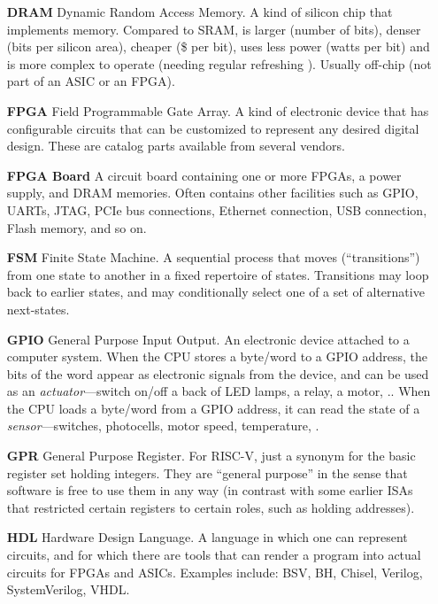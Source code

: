 \begin{itemize}
\item[\bf DRAM] Dynamic Random Access Memory.  A kind of silicon chip
  that implements memory.  Compared to SRAM, is larger (number of
  bits), denser (bits per silicon area), cheaper (\$ per bit), uses
  less power (watts per bit) and is more complex to operate (needing
  regular refreshing {\etc}). Usually off-chip (not part of an ASIC or
  an FPGA).

\item[\bf FPGA] Field Programmable Gate Array.  A kind of electronic
  device that has configurable circuits that can be customized to
  represent any desired digital design.  These are catalog parts
  available from several vendors.

\item[\bf FPGA Board] A circuit board containing one or more FPGAs, a
  power supply, and DRAM memories.  Often contains other facilities
  such as GPIO, UARTs, JTAG, PCIe bus connections, Ethernet
  connection, USB connection, Flash memory, and so on.

\item[\bf FSM] Finite State Machine.  A sequential process that moves
  (``transitions'') from one state to another in a fixed repertoire of
  states.  Transitions may loop back to earlier states, and may
  conditionally select one of a set of alternative next-states.

\item[\bf GPIO] General Purpose Input Output.  An electronic device
  attached to a computer system. When the CPU stores a byte/word to a
  GPIO address, the bits of the word appear as electronic signals from
  the device, and can be used as an \emph{actuator}---switch on/off a
  back of LED lamps, a relay, a motor, {\etc.}.  When the CPU loads a
  byte/word from a GPIO address, it can read the state of a
  \emph{sensor}---switches, photocells, motor speed, temperature,
  {\etc.}

\item[\bf GPR] General Purpose Register.  For RISC-V, just a synonym
  for the basic register set holding integers.  They are ``general
  purpose'' in the sense that software is free to use them in any way
  (in contrast with some earlier ISAs that restricted certain
  registers to certain roles, such as holding addresses).

\item[\bf HDL] Hardware Design Language.  A language in which one can
  represent circuits, and for which there are tools that can render a
  program into actual circuits for FPGAs and ASICs.  Examples include:
  BSV, BH, Chisel, Verilog, SystemVerilog, VHDL.


\end{itemize}
